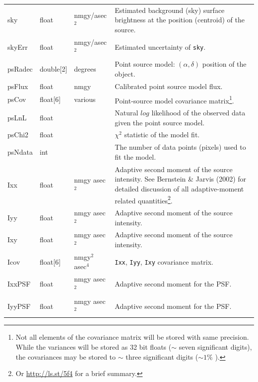 \documentclass[12pt]{article}
\begin{document}
\begin{center}
\begin{longtable}{p{3cm}p{2cm}p{2cm}p{5cm}}
sky & float & nmgy/asec$^{2}$ & Estimated background (sky) surface brightness at the position (centroid) of the source. \\

skyErr & float & nmgy/asec$^{2}$ & Estimated uncertainty of \texttt{sky}. \\

psRadec & double[2] & degrees & Point source model: $(\alpha, \delta)$ position of the object. \\

psFlux & float & nmgy & Calibrated point source model flux.\\

psCov & float[6] & various & Point-source model covariance matrix\footnote{Not all elements of the covariance matrix will be stored with same precision. While the variances will be stored as 32 bit floats ($\sim$ seven significant digits), the covariances may be stored to $\sim$ three significant digits ($\sim 1$\% ).}. \\

psLnL & float & ~ & Natural $log$ likelihood of the observed data given the point source model. \\

psChi2 & float & ~ & $\chi^2$ statistic of the model fit. \\

psNdata & int & ~ & The number of data points (pixels) used to fit the model. \\

Ixx & float & nmgy asec$^{2}$ & Adaptive second moment of the source intensity. See Bernstein \& Jarvis (2002) for detailed discussion of all adaptive-moment related quantities\footnote{Or \url{http://ls.st/5f4} for a brief summary.}. \\

Iyy & float & nmgy asec$^{2}$ & Adaptive second moment of the source intensity. \\

Ixy & float & nmgy asec$^{2}$ & Adaptive second moment of the source intensity. \\

Icov & float[6] & nmgy$^{2}$ asec$^{4}$ & {\tt Ixx}, {\tt Iyy}, {\tt Ixy} covariance matrix. \\

IxxPSF & float & nmgy asec$^{2}$ & Adaptive second moment for the PSF. \\

IyyPSF & float & nmgy asec$^{2}$ & Adaptive second moment for the PSF. \\


\end{longtable}
\end{center}
\end{document}
